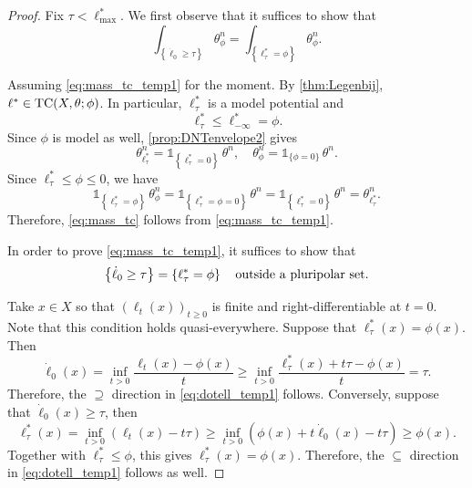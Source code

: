 \begin{proof}
    Fix $\tau<\ell^*_{\max}$.
    We first observe that it suffices to show that
    \begin{equation}\label{eq:mass_tc_temp1}
    \int_{\left\{\dot{\ell}_0\geq \tau\right\}} \theta_{\phi}^n=\int_{\left\{\ell^*_{\tau}=\phi\right\}} \theta_{\phi}^n.
    \end{equation}

    Assuming \eqref{eq:mass_tc_temp1} for the moment.
    By \cref{thm:Legenbij}, $\ell^*\in\mathrm{TC}(X,\theta;\phi)$. In particular, $\ell^*_\tau$ is a model potential and
    \[
        \ell^*_\tau\leq \ell^*_{-\infty}=\phi.
    \]
    Since $\phi$ is model as well, \cref{prop:DNTenvelope2} gives
    \[
        \theta^n_{\ell^*_{\tau}}=\mathds{1}_{\left\{\ell^*_{\tau}=0\right\}}\,\theta^n,\quad \theta^n_{\phi}=\mathds{1}_{\{\phi=0\}}\,\theta^n.
    \]
    Since $\ell^*_{\tau}\leq \phi \leq 0$, we have
    \[
        \mathds{1}_{\left\{\ell^*_{\tau}=\phi\right\}}\,\theta_{\phi}^n
        =\mathds{1}_{\left\{\ell^*_{\tau}=\phi=0\right\}}\,\theta^n
        =\mathds{1}_{\left\{\ell^*_{\tau}=0\right\}}\,\theta^n
        =\theta^n_{\ell^*_{\tau}}.
    \]
    Therefore, \eqref{eq:mass_tc} follows from \eqref{eq:mass_tc_temp1}.

    In order to prove \eqref{eq:mass_tc_temp1}, it suffices to show that
    \begin{equation}\label{eq:dotell_temp1}
    \left\{\dot{\ell}_0\geq \tau\right\}=\left\{\ell^*_{\tau}=\phi\right\}\quad \textup{outside a pluripolar set}.
    \end{equation}

    Take $x\in X$ so that $(\ell_t(x))_{t\geq 0}$ is finite and right-differentiable at $t=0$. Note that this condition holds quasi-everywhere. Suppose that $\ell^*_{\tau}(x)=\phi(x)$. Then
    \[
    \dot{\ell}_0(x)=\inf_{t>0} \frac{\ell_t(x)-\phi(x)}{t}\geq \inf_{t>0} \frac{\ell^*_{\tau}(x)+t\tau-\phi(x)}{t}=\tau.
    \]
    Therefore, the $\supseteq$ direction in \eqref{eq:dotell_temp1} follows.
    Conversely, suppose that $\dot{\ell}_0(x)\geq \tau$, then
    \[
    \ell^*_{\tau}(x)=\inf_{t>0} \left(\ell_t(x)-t\tau\right)\geq \inf_{t>0} \left(\phi(x)+t\dot{\ell}_0(x)-t\tau\right)\geq \phi(x).
    \]
    Together with $\ell^*_\tau\leq\phi$, this gives $\ell^*_\tau(x)=\phi(x)$.
    Therefore, the $\subseteq$ direction in \eqref{eq:dotell_temp1}  follows as well.
\end{proof}

